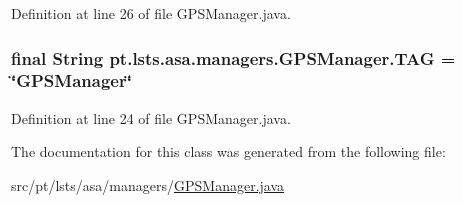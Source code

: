 Definition at line 26 of file G\+P\+S\+Manager.\+java.

\hypertarget{classpt_1_1lsts_1_1asa_1_1managers_1_1GPSManager_a87bf0b045ff632c19f847ac728d0001d}{}
\subsubsection[{T\+A\+G}]{\setlength{\rightskip}{0pt plus 5cm}final String pt.\+lsts.\+asa.\+managers.\+G\+P\+S\+Manager.\+T\+A\+G = \char`\"{}G\+P\+S\+Manager\char`\"{}\hspace{0.3cm}{\ttfamily [static]}}\label{classpt_1_1lsts_1_1asa_1_1managers_1_1GPSManager_a87bf0b045ff632c19f847ac728d0001d}


Definition at line 24 of file G\+P\+S\+Manager.\+java.



The documentation for this class was generated from the following file\+:\begin{DoxyCompactItemize}
\item 
src/pt/lsts/asa/managers/\hyperlink{GPSManager_8java}{G\+P\+S\+Manager.\+java}\end{DoxyCompactItemize}

